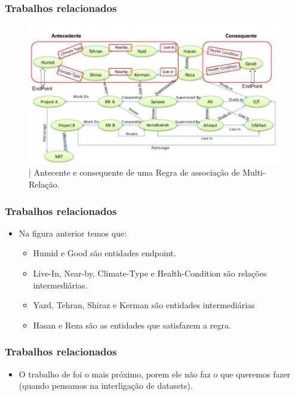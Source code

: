 \documentclass[hyperref={pdfpagelabels=false}]{beamer}
\begin{document}
\begin{frame}
\frametitle{Trabalhos relacionados}
\begin{figure}[h]
	\centering
		\includegraphics[scale=0.3]{img/Grafico_MRAR_2}
	\caption{| Antecente e consequente de uma Regra de associação de Multi-Relação.}
	\label{fig:Grafico_MRAR_2}
\end{figure}
\end{frame}



\begin{frame}
	\frametitle{Trabalhos relacionados}
\begin{itemize}
      


\item Na figura anterior temos que:
	\begin{itemize}
    \item {Humid e Good são entidades endpoint.}
    \item {Live-In, Near-by, Climate-Type e Health-Condition são relações intermediárias. }  
    \item Yazd, Tehran, Shiraz e Kerman são entidades intermediárias
    \item Hasan e Reza são as entidades que  satisfazem a regra.
	\end{itemize}
\end{itemize}
\end{frame}


\begin{frame}
\frametitle{Trabalhos relacionados}
\begin{itemize}
\item O trabalho de \cite{Ramezani2014} foi o mais próximo, porem ele não faz o que queremos fazer (quando pensamos na interligação de datasets).
\end{itemize}		
\end{frame}
\end{document}
